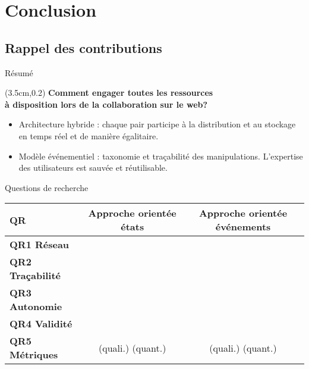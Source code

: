 \section{Conclusion}
\subsection{Rappel des contributions}
\begin{frame}{Résumé}

	\begin{textblock*}{95mm}(3.5cm,0.2\textheight)
	\centering \large
	\textbf{ {\color{Purple}Comment engager toutes les ressources \\ à 
			disposition 
			lors de la collaboration  sur le web?}}
\end{textblock*}

\vspace*{0.5cm}
\begin{minipage}{0.5\textwidth}
	\begin{itemize}		
		\item Architecture hybride : chaque pair participe à la distribution et au 
		stockage en temps réel et de manière égalitaire.
		\item Modèle événementiel : taxonomie et traçabilité des manipulations. 
		L'expertise des utilisateurs est sauvée et réutilisable.

	\end{itemize}
\end{minipage}\hfill
\begin{minipage}{0.5\textwidth}
	\vspace*{0.5cm}
	\centering
{}
\end{minipage}
\end{frame}


\begin{frame}{Questions de recherche}
\begin{table}
	\begin{tabular}{lcc}
		\hline
		\textbf{QR}              & \textbf{Approche orientée états} & \textbf{Approche 
			orientée événements} \\ \hline
		\textbf{QR1 Réseau}      &\tickpartial                         &  
		\tick                         \\
		\textbf{QR2 Traçabilité} &     \fail                & \tick                                  \\
		\textbf{QR3 Autonomie}   & \tickpartial                           & \tick                 \\
		\textbf{QR4 Validité}    &         \fail                         &\tick                      \\
		\textbf{QR5 Métriques}  &  \tickpartial (quali.) \fail  (quant.) & \tick (quali.)  
		\tickpartial  (quant.)       \\ \hline
	\end{tabular}
\end{table}

\end{frame}

